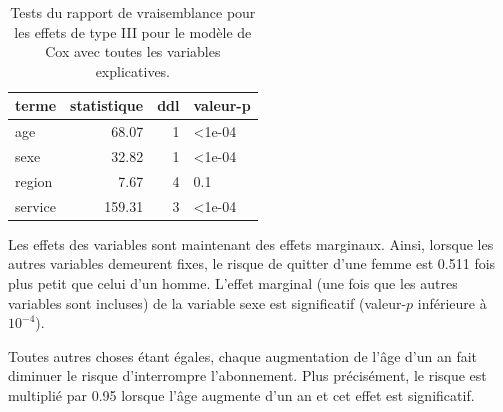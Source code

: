 \documentclass[
  11pt,
  letterpaper,
]{book}
\theoremstyle{definition}
\theoremstyle{remark}
\begin{document}
\hypertarget{tbl-survie5-deviance}{}
\begin{table}
\caption{\label{tbl-survie5-deviance}Tests du rapport de vraisemblance pour les effets de type III pour le
modèle de Cox avec toutes les variables explicatives. }\tabularnewline

\centering
\begin{tabular}{lrrl}
\toprule
terme & statistique & ddl & valeur-p\\
\midrule
age & 68.07 & 1 & <1e-04\\
sexe & 32.82 & 1 & <1e-04\\
region & 7.67 & 4 & 0.1\\
service & 159.31 & 3 & <1e-04\\
\bottomrule
\end{tabular}
\end{table}

Les effets des variables sont maintenant des effets marginaux. Ainsi,
lorsque les autres variables demeurent fixes, le risque de quitter d'une
femme est 0.511 fois plus petit que celui d'un homme. L'effet marginal
(une fois que les autres variables sont incluses) de la variable sexe
est significatif (valeur-\(p\) inférieure à \(10^{-4}\)).

Toutes autres choses étant égales, chaque augmentation de l'âge d'un an
fait diminuer le risque d'interrompre l'abonnement. Plus précisément, le
risque est multiplié par 0.95 lorsque l'âge augmente d'un an et cet
effet est significatif.
\end{document}
